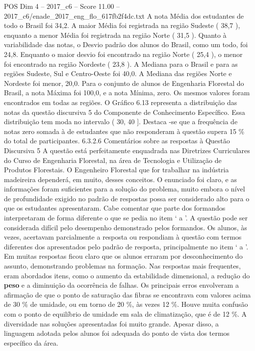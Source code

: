 \begin{textsample}{POS Dim 4 – 2017\_c6 – Score 11.00 – 2017\_c6/enade\_2017\_eng\_flo\_617fb2f4dc.txt}
A nota Média dos estudantes de todo o Brasil foi 34,2.
A maior Média foi registrada na região Sudeste ( 38,7 ), enquanto a menor Média foi registrada na região Norte ( 31,5 ).
Quanto à variabilidade das notas, o Desvio padrão dos alunos do Brasil, como um todo, foi 24,8.
Enquanto o maior desvio foi encontrado na região Norte ( 25,4 ), o menor foi encontrado na região Nordeste ( 23,8 ).
A Mediana para o Brasil e para as regiões Sudeste, Sul e Centro-Oeste foi 40,0.
A Mediana das regiões Norte e Nordeste foi menor, 20,0.
Para o conjunto de alunos de Engenharia Florestal do Brasil, a nota Máxima foi 100,0, e a nota Mínima, zero.
Os mesmos valores foram encontrados em todas as regiões.
O Gráfico 6.13 representa a distribuição das notas da questão discursiva 5 do Componente de Conhecimento Específico.
Essa distribuição tem moda no intervalo ( 30, 40 ].
Destaca -se que a frequência de notas zero somada à de estudantes que não responderam à questão supera 15 \% do total de participantes. 6.3.2.6 Comentários sobre as respostas à Questão Discursiva 5 A questão está perfeitamente enquadrada nas Diretrizes Curriculares do Curso de Engenharia Florestal, na área de Tecnologia e Utilização de Produtos Florestais.
O Engenheiro Florestal que for trabalhar na indústria madeireira dependerá, em muito, desses conceitos.
O enunciado foi claro, e as informações foram suficientes para a solução do problema, muito embora o nível de profundidade exigido no padrão de respostas possa ser considerado alto para o que os estudantes apresentaram.
Cabe comentar que parte dos formandos interpretaram de forma diferente o que se pedia no item ‘ a ’.
A questão pode ser considerada difícil pelo desempenho demonstrado pelos formandos.
Os alunos, às vezes, acertavam parcialmente a resposta ou respondiam à questão com termos diferentes dos apresentados pelo padrão de resposta, principalmente no item ‘ a ’.
Em muitas respostas ficou claro que os alunos erraram por desconhecimento do assunto, demonstrando problemas na formação.
Nas respostas mais frequentes, eram abordados itens, como o aumento da estabilidade dimensional, a redução do \textbf{peso} e a diminuição da ocorrência de falhas.
Os principais erros envolveram a afirmação de que o ponto de saturação das fibras se encontrava com valores acima de 30 \% de umidade, ou em torno de 20 \%, às vezes 12 \%.
Houve muita confusão com o ponto de equilíbrio de umidade em sala de climatização, que é de 12 \%.
A diversidade nas soluções apresentadas foi muito grande.
Apesar disso, a linguagem adotada pelos alunos foi adequada do ponto de vista dos termos específico da área.

\end{textsample}
